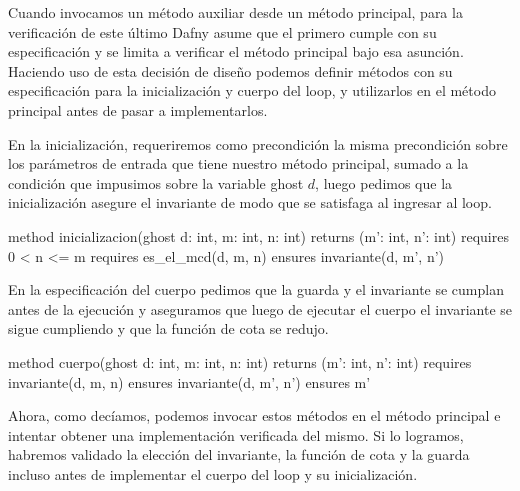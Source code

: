 \documentclass[12pt, a4paper, openany, fleqn]{book}
\begin{document}
    Cuando invocamos un método auxiliar desde un método principal, para la verificación de este último Dafny asume que el primero cumple con su especificación y se limita a verificar el método principal bajo esa asunción. Haciendo uso de esta decisión de diseño podemos definir métodos con su especificación para la inicialización y cuerpo del loop, y utilizarlos en el método principal antes de pasar a implementarlos.

    En la inicialización, requeriremos como precondición la misma precondición sobre los parámetros de entrada que tiene nuestro método principal, sumado a la condición que impusimos sobre la variable ghost $d$, luego pedimos que la inicialización asegure el invariante de modo que se satisfaga al ingresar al loop.

    \vspace{1em}
    \begin{greenbox}
    \begin{dafny}[gobble=8]
        method inicializacion(ghost d: int, m: int, n: int)
            returns (m': int, n': int)
            requires 0 < n <= m
            requires es_el_mcd(d, m, n)
            ensures invariante(d, m', n')
    \end{dafny}
    \end{greenbox}
    \vspace{1em}

    En la especificación del cuerpo pedimos que la guarda y el invariante se cumplan antes de la ejecución y aseguramos que luego de ejecutar el cuerpo el invariante se sigue cumpliendo y que la función de cota se redujo.


    \vspace{1em}
    \begin{greenbox}
    \begin{dafny}[gobble=8]
        method cuerpo(ghost d: int, m: int, n: int)
            returns (m': int, n': int)
            requires invariante(d, m, n)
            ensures invariante(d, m', n')
            ensures m' %
    \end{dafny}
    \end{greenbox}
    \vspace{1em}

    Ahora, como decíamos, podemos invocar estos métodos en el método principal e intentar obtener una implementación verificada del mismo. Si lo logramos, habremos validado la elección del invariante, la función de cota y la guarda incluso antes de implementar el cuerpo del loop y su inicialización.
\end{document}

